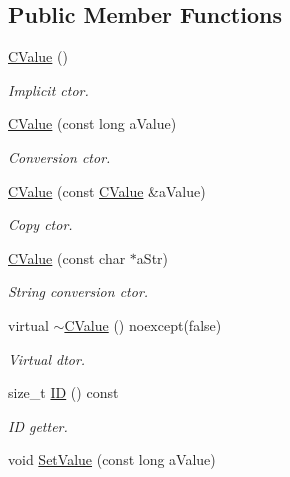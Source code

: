 \subsection*{Public Member Functions}
\begin{DoxyCompactItemize}
\item 
\hyperlink{class_c_value__long_1_1_c_value_a40c175a667125b6dc8faa84b0424ce4d}{C\+Value} ()
\begin{DoxyCompactList}\small\item\em Implicit c\textquotesingle{}tor. \end{DoxyCompactList}\item 
\hyperlink{class_c_value__long_1_1_c_value_a5c36e74c9d748c86e4061b38ac1749b7}{C\+Value} (const long a\+Value)
\begin{DoxyCompactList}\small\item\em Conversion c\textquotesingle{}tor. \end{DoxyCompactList}\item 
\hyperlink{class_c_value__long_1_1_c_value_a88c1a4c4f4f157417b382f2ea9f7836d}{C\+Value} (const \hyperlink{class_c_value__long_1_1_c_value}{C\+Value} \&a\+Value)
\begin{DoxyCompactList}\small\item\em Copy c\textquotesingle{}tor. \end{DoxyCompactList}\item 
\hyperlink{class_c_value__long_1_1_c_value_a098c962b0bcf399ec9179ac5dd9cc42f}{C\+Value} (const char $\ast$a\+Str)
\begin{DoxyCompactList}\small\item\em String conversion c\textquotesingle{}tor. \end{DoxyCompactList}\item 
virtual \hyperlink{class_c_value__long_1_1_c_value_aedefeae635e586789cd62bd9ec5401de}{$\sim$\+C\+Value} () noexcept(false)
\begin{DoxyCompactList}\small\item\em Virtual d\textquotesingle{}tor. \end{DoxyCompactList}\item 
size\+\_\+t \hyperlink{class_c_value__long_1_1_c_value_aa7ef0a671a39efbc567fa9c6a1fb49a8}{ID} () const
\begin{DoxyCompactList}\small\item\em ID getter. \end{DoxyCompactList}\item 
void \hyperlink{class_c_value__long_1_1_c_value_a8caf06185aa1c4ecd60d70c5d0d02631}{Set\+Value} (const long a\+Value)

\end{DoxyCompactItemize}
